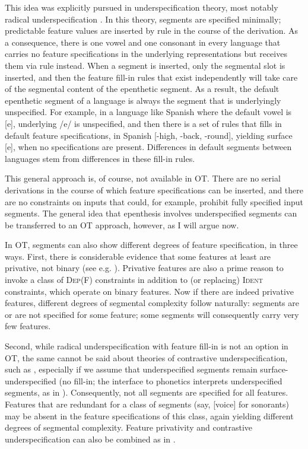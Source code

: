\documentclass[output=paper,colorlinks,citecolor=brown]{langscibook}
\begin{document}
This idea was explicitly pursued in underspecification theory, most notably radical underspecification \citep{Archangeli1988, pulley88}. In this theory, segments are specified minimally; predictable feature values are inserted by rule in the course of the derivation. As a consequence, there is one vowel and one consonant in every language that carries no feature specifications in the underlying representations but receives them via rule instead. When a segment is inserted, only the segmental slot is inserted, and then the feature fill-in rules that exist independently will take care of the segmental content of the epenthetic segment. As a result, the default epenthetic segment of a language is always the segment that is underlyingly unspecified. For example, in a language like Spanish where the default vowel is [e], underlying /e/ is unspecified, and then there is a set of rules that fills in default feature specifications, in Spanish [-high, -back, -round], yielding surface [e], when no specifications are present. Differences in default segments between languages stem from differences in these fill-in rules.

This general approach is, of course, not available in OT. There are no serial derivations in the course of which feature specifications can be inserted, and there are no constraints on inputs that could, for example, prohibit fully specified input segments. The general idea that epenthesis involves underspecified segments can  be transferred to an OT approach, however, as I will argue now.

In OT, segments can also show different degrees of feature specification, in three ways. First, there is considerable evidence that some features at least are privative, not binary (see e.g. \citealt{clemhume, lombardi96, andersonewen, beckjessring}). Privative features are also a prime reason to invoke a class of \textsc{Dep}(F) constraints in addition to (or replacing) \textsc{Ident} constraints, which operate on binary features. Now if there are indeed privative features, different degrees of segmental complexity follow naturally: segments are or are not specified for some feature; some segments will consequently carry very few features.

Second, while radical underspecification with feature fill-in is not an option in OT, the same cannot be said about theories of contrastive underspecification, such as \citet{dresher09}, especially if we assume that underspecified segments remain surface-underspecified (no fill-in; the interface to phonetics interprets underspecified segments, as in \citealt{HallD:2011}). Consequently, not all segments are specified for all features. Features that are redundant for a class of segments (say, [voice] for sonorants) may be absent in the feature specifications of this class, again yielding different degrees of segmental complexity. Feature privativity and contrastive underspecification can also be combined as in \citet{iosadphd}.
\end{document}
